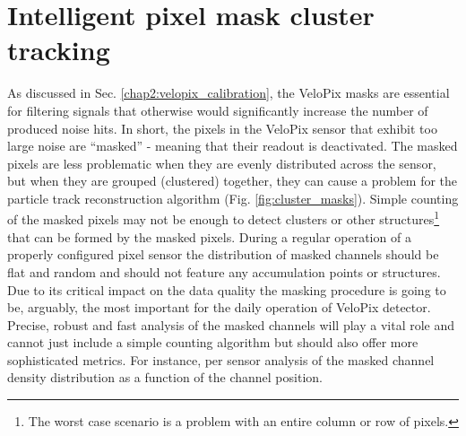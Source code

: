 \section{Intelligent pixel mask cluster tracking}
\label{sec:velopix-mask}
As discussed in Sec. \ref{chap2:velopix_calibration}, the VeloPix masks are essential for filtering signals that otherwise would significantly increase the number of produced noise hits.
In short, the pixels in the VeloPix sensor that exhibit too large noise are ``masked'' - meaning that their readout is deactivated.
The masked pixels are less problematic when they are evenly distributed across the sensor, but when
they are grouped (clustered) together, they can cause a problem for the particle track reconstruction algorithm (Fig. \ref{fig:cluster_masks}).
Simple counting of the masked pixels may not be enough to detect clusters or other structures\footnote{The worst case scenario is a problem with an entire column or row of pixels.} that can be formed by the masked pixels.
During a regular operation of a properly configured pixel sensor the distribution of masked channels should be flat and random and should not feature any accumulation points or structures. Due to its critical impact on the data quality the masking procedure is going to be, arguably, the most important for the daily operation of VeloPix detector. Precise, robust and fast analysis of the masked channels will play a vital role and cannot just include a simple counting algorithm but should also offer more sophisticated metrics. For instance, per sensor analysis of the masked channel density distribution as a function of the channel position. 

